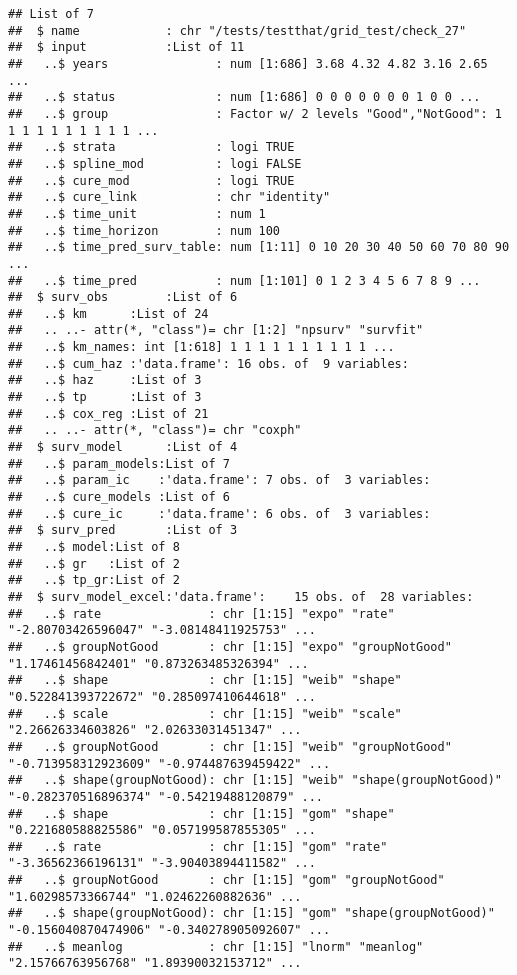 \documentclass[
]{article}
\begin{document}
\begin{verbatim}
## List of 7
##  $ name            : chr "/tests/testthat/grid_test/check_27"
##  $ input           :List of 11
##   ..$ years               : num [1:686] 3.68 4.32 4.82 3.16 2.65 ...
##   ..$ status              : num [1:686] 0 0 0 0 0 0 0 1 0 0 ...
##   ..$ group               : Factor w/ 2 levels "Good","NotGood": 1 1 1 1 1 1 1 1 1 1 ...
##   ..$ strata              : logi TRUE
##   ..$ spline_mod          : logi FALSE
##   ..$ cure_mod            : logi TRUE
##   ..$ cure_link           : chr "identity"
##   ..$ time_unit           : num 1
##   ..$ time_horizon        : num 100
##   ..$ time_pred_surv_table: num [1:11] 0 10 20 30 40 50 60 70 80 90 ...
##   ..$ time_pred           : num [1:101] 0 1 2 3 4 5 6 7 8 9 ...
##  $ surv_obs        :List of 6
##   ..$ km      :List of 24
##   .. ..- attr(*, "class")= chr [1:2] "npsurv" "survfit"
##   ..$ km_names: int [1:618] 1 1 1 1 1 1 1 1 1 1 ...
##   ..$ cum_haz :'data.frame': 16 obs. of  9 variables:
##   ..$ haz     :List of 3
##   ..$ tp      :List of 3
##   ..$ cox_reg :List of 21
##   .. ..- attr(*, "class")= chr "coxph"
##  $ surv_model      :List of 4
##   ..$ param_models:List of 7
##   ..$ param_ic    :'data.frame': 7 obs. of  3 variables:
##   ..$ cure_models :List of 6
##   ..$ cure_ic     :'data.frame': 6 obs. of  3 variables:
##  $ surv_pred       :List of 3
##   ..$ model:List of 8
##   ..$ gr   :List of 2
##   ..$ tp_gr:List of 2
##  $ surv_model_excel:'data.frame':    15 obs. of  28 variables:
##   ..$ rate               : chr [1:15] "expo" "rate" "-2.80703426596047" "-3.08148411925753" ...
##   ..$ groupNotGood       : chr [1:15] "expo" "groupNotGood" "1.17461456842401" "0.873263485326394" ...
##   ..$ shape              : chr [1:15] "weib" "shape" "0.522841393722672" "0.285097410644618" ...
##   ..$ scale              : chr [1:15] "weib" "scale" "2.26626334603826" "2.02633031451347" ...
##   ..$ groupNotGood       : chr [1:15] "weib" "groupNotGood" "-0.713958312923609" "-0.974487639459422" ...
##   ..$ shape(groupNotGood): chr [1:15] "weib" "shape(groupNotGood)" "-0.282370516896374" "-0.54219488120879" ...
##   ..$ shape              : chr [1:15] "gom" "shape" "0.221680588825586" "0.057199587855305" ...
##   ..$ rate               : chr [1:15] "gom" "rate" "-3.36562366196131" "-3.90403894411582" ...
##   ..$ groupNotGood       : chr [1:15] "gom" "groupNotGood" "1.60298573366744" "1.02462260882636" ...
##   ..$ shape(groupNotGood): chr [1:15] "gom" "shape(groupNotGood)" "-0.156040870474906" "-0.340278905092607" ...
##   ..$ meanlog            : chr [1:15] "lnorm" "meanlog" "2.15766763956768" "1.89390032153712" ...

\end{verbatim}
\end{document}
